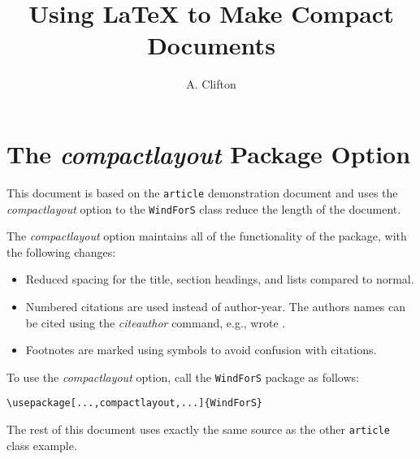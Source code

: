 \documentclass[twocolumn,a4paper]{article}
\title{Using LaTeX to Make Compact Documents}
\author{A. Clifton}
\begin{document}
\lstset{language=[LaTeX]Tex,columns=fullflexible,keepspaces=true,breaklines=true}

\section*{The \emph{compactlayout} Package Option}

This document is based on the \texttt{article} demonstration document and uses the \emph{compactlayout} option to the \texttt{WindForS} class reduce the length of the document.

The \emph{compactlayout} option maintains all of the functionality of the package, with the following changes:
\begin{itemize}
\item Reduced spacing for the title, section headings, and lists compared to normal.
\item Numbered citations are used \citep[e.g.,][]{TechReportTest} instead of author-year. The authors names can be cited using the \emph{citeauthor} command, e.g., \citeauthor{TechReportTest} wrote \cite{TechReportTest}.
\item Footnotes are marked using symbols to avoid confusion with citations.  
\end{itemize}

To use the \emph{compactlayout} option, call the \texttt{WindForS} package as follows:

\begin{lstlisting}
\usepackage[...,compactlayout,...]{WindForS}
\end{lstlisting}

The rest of this document uses exactly the same source as the other \texttt{article} class example.

\clearpage

\maketitle



\tableofcontents
\listoffigures
\listoftables






\label{sec:TheBibliography}
\printbibliography

\appendix


\end{document}
